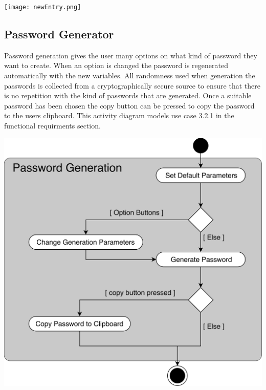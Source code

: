 \documentclass[11pt]{report}
\begin{document}
\vspace{4mm}
\begin{center}
\texttt{[image: newEntry.png]}
\end{center}

\clearpage

\subsection{Password Generator}
Password generation gives the user many options on what kind of password they want to create. When an option is changed the password is regenerated automatically with the new variables. All randomness used when generation the passwords is collected from a cryptographically secure source to ensure that there is no repetition with the kind of passwords that are generated. Once a suitable password has been chosen the copy button can be pressed to copy the password to the users clipboard. This activity diagram models use case 3.2.1 in the functional requirments section.

\vspace{4mm}
\includegraphics [scale=.09]{passgen.png}

\clearpage
\end{document}
